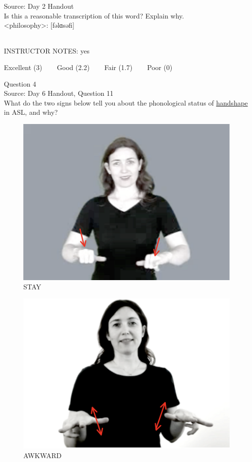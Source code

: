 \documentclass[12pt]{article}
\begin{document}
Source: Day 2 Handout\\

Is this a reasonable transcription of this word? Explain why.\\

<philosophy>: {[fəlɑsəfi]}


~\\
INSTRUCTOR NOTES: yes


\vfill
Excellent (3) ~~~ Good (2.2) ~~~ Fair (1.7) ~~~ Poor (0)
\newpage

{\large Question 4}\\

Source: Day 6 Handout, Question 11\\

What do the two signs below tell you about the phonological status of \underline{handshape} in ASL, and why?\\

\begin{figure}[H]
\includegraphics{../images/asl_stay.png}
\caption{STAY}
\end{figure}
\begin{figure}[H]
\includegraphics{../images/asl_awkward.png}
\caption{AWKWARD}
\end{figure}
\end{document}
